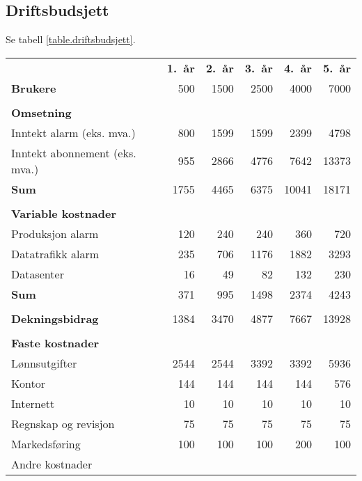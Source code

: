 \subsection{Driftsbudsjett}

Se tabell \vref{table.driftsbudsjett}.

\begin{table}
  \begin{tabular}{lrrrrr}
   & \textbf{1.~år} & \textbf{2.~år} & \textbf{3.~år} & \textbf{4.~år} & \textbf{5.~år} \\
    \textbf{Brukere} & 500 & 1500 & 2500 & 4000 & 7000 \\
    \\
    \textbf{Omsetning} \\
    Inntekt alarm   (eks. mva.)      &  800 & 1599 & 1599 &  2399 &  4798 \\
    Inntekt abonnement (eks. mva.)   &  955 & 2866 & 4776 &  7642 & 13373 \\
    \textbf{Sum}                     & 1755 & 4465 & 6375 & 10041 & 18171 \\
    \\
    \textbf{Variable kostnader} \\
    Produksjon alarm                &   120 &  240 &  240 &   360 &   720 \\
    Datatrafikk alarm               &   235 &  706 & 1176 &  1882 &  3293 \\
    Datasenter                      &    16 &   49 &   82 &   132 &   230 \\
    \textbf{Sum}                    &   371 &  995 & 1498 &  2374 &  4243 \\
    \\
    \textbf{Dekningsbidrag}         &  1384 & 3470 & 4877 &  7667 & 13928 \\
    \hline
    \\
    \textbf{Faste kostnader} \\
    Lønnsutgifter                   &  2544 & 2544 & 3392 &  3392 &  5936 \\
    Kontor                          &   144 &  144 &  144 &   144 &   576 \\
    Internett                       &    10 &   10 &   10 &    10 &    10 \\
    Regnskap og revisjon            &    75 &   75 &   75 &    75 &    75 \\
    Markedsføring                   &   100 &  100 &  100 &   200 &   100 \\
    Andre kostnader

\end{tabular}
\end{table}
